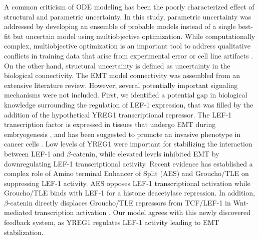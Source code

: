 \documentclass[11pt,letterpaper]{article}
\begin{document}
A common criticism of ODE modeling has been the poorly characterized effect of structural and parametric uncertainty.
In this study, parametric uncertainty was addressed by developing an ensemble of probable models instead of a single best-fit but uncertain model using multiobjective optimization.
While computationally complex, multiobjective optimization is an important tool to address qualitative conflicts in training data that arise from experimental error or cell line artifacts \cite{Handl:2007fk}.
On the other hand, structural uncertainty is defined as uncertainty in the biological connectivity.
The EMT model connectivity was assembled from an extensive literature review. However, several potentially important signaling mechanisms were not included.
First, we identified a potential gap in biological knowledge surrounding the regulation of LEF-1 expression, that was filled by the addition of the hypothetical YREG1 transcriptional repressor.
The LEF-1 transcription factor is expressed in tissues that undergo EMT during embryogenesis \cite{Vega:2004qf,Nawshad:2003ff},
and has been suggested to promote an invasive phenotype in cancer cells \cite{Cano:2000kh,Kim:2002lh}.
Low levels of YREG1 were important for stabilizing the interaction between LEF-1 and $\beta$-catenin, while elevated levels inhibited EMT by downregulating LEF-1 transcriptional activity.
Recent evidence has established a complex role of Amino terminal Enhancer of Split (AES) and Groucho/TLE on suppressing LEF-1 activity.
AES opposes LEF-1 transcriptional activation while Groucho/TLE binds with LEF-1 for a histone deacetylase repression.
In addition, $\beta$-catenin directly displaces Groucho/TLE repressors from TCF/LEF-1 in Wnt-mediated transcription activation \cite{Arce:2009pr, Grumolato2013}.
Our model agrees with this newly discovered feedback system, as YREG1 regulates LEF-1 activity leading to EMT stabilization.
\end{document}
